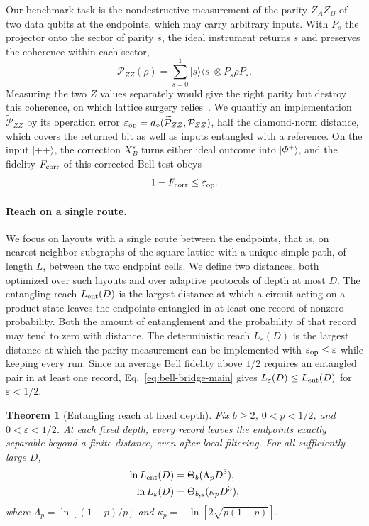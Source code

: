 \documentclass[aps,prl,twocolumn,superscriptaddress,longbibliography,reprint,floatfix]{revtex4-2}
\newcommand{\ket}[1]{\lvert #1\rangle}
\newcommand{\bra}[1]{\langle #1\rvert}
\newcommand{\eps}{\varepsilon}
\newtheorem{theorem}{Theorem}
\begin{document}
Our benchmark task is the nondestructive measurement of the parity $Z_AZ_B$ of two data qubits at the endpoints, which may carry arbitrary inputs. With $P_s$ the projector onto the sector of parity $s$, the ideal instrument returns $s$ and preserves the coherence within each sector,
\begin{equation}
 \mathcal P_{ZZ}(\rho)=\sum_{s=0}^1 \ket{s}\bra{s}\otimes P_s\rho P_s .
 \label{eq:target-main}
\end{equation}
Measuring the two $Z$ values separately would give the right parity but destroy this coherence, on which lattice surgery relies~\cite{Horsman2012,Chamberland2022}. We quantify an implementation $\widetilde{\mathcal P}_{ZZ}$ by its operation error $\eps_{\rm op}=d_\diamond(\widetilde{\mathcal P}_{ZZ},\mathcal P_{ZZ})$, half the diamond-norm distance, which covers the returned bit as well as inputs entangled with a reference. On the input $\ket{++}$, the correction $X_B^s$ turns either ideal outcome into $\ket{\Phi^+}$, and the fidelity $F_{\rm corr}$ of this corrected Bell test obeys
\begin{equation}
 1-F_{\rm corr}\le \eps_{\rm op}.
 \label{eq:bell-bridge-main}
\end{equation}

\smallskip
\paragraph*{Reach on a single route.}
We focus on layouts with a single route between the endpoints, that is, on nearest-neighbor subgraphs of the square lattice with a unique simple path, of length $L$, between the two endpoint cells. We define two distances, both optimized over such layouts and over adaptive protocols of depth at most $D$. The entangling reach $L_{\rm ent}(D)$ is the largest distance at which a circuit acting on a product state leaves the endpoints entangled in at least one record of nonzero probability. Both the amount of entanglement and the probability of that record may tend to zero with distance. The deterministic reach $L_\eps(D)$ is the largest distance at which the parity measurement can be implemented with $\eps_{\rm op}\le\eps$ while keeping every run. Since an average Bell fidelity above $1/2$ requires an entangled pair in at least one record, Eq.~\eqref{eq:bell-bridge-main} gives $L_\eps(D)\le L_{\rm ent}(D)$ for $\eps<1/2$.

\begin{theorem}[Entangling reach at fixed depth]
\label{thm:time}
Fix $b\ge2$, $0<p<1/2$, and $0<\eps<1/2$. At each fixed depth, every record leaves the endpoints exactly separable beyond a finite distance, even after local filtering. For all sufficiently large $D$,
\begin{equation}
 \begin{aligned}
 \ln L_{\rm ent}(D)&=\Theta_b(\Lambda_p D^3),\\
 \ln L_\eps(D)&=\Theta_{b,\eps}(\kappa_p D^3),
 \end{aligned}
 \label{eq:optimal-reach}
\end{equation}
where $\Lambda_p=\ln[(1-p)/p]$ and $\kappa_p=-\ln[2\sqrt{p(1-p)}]$.
\end{theorem}
\end{document}
